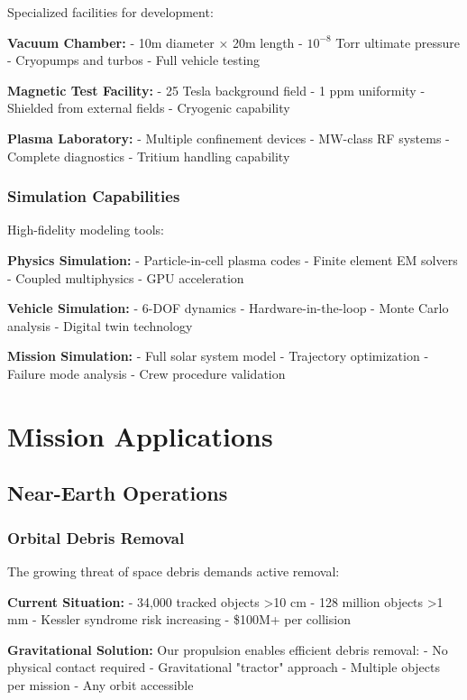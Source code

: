 \documentclass[12pt,letterpaper]{book}
\theoremstyle{definition}
\theoremstyle{plain}
\theoremstyle{remark}
\begin{document}
{{{{{Specialized facilities for development:

\textbf{Vacuum Chamber:}
- 10m diameter × 20m length
- $10^{-8}$ Torr ultimate pressure
- Cryopumps and turbos
- Full vehicle testing

\textbf{Magnetic Test Facility:}
- 25 Tesla background field
- 1 ppm uniformity
- Shielded from external fields
- Cryogenic capability

\textbf{Plasma Laboratory:}
- Multiple confinement devices
- MW-class RF systems
- Complete diagnostics
- Tritium handling capability

\subsection{Simulation Capabilities}

High-fidelity modeling tools:

\textbf{Physics Simulation:}
- Particle-in-cell plasma codes
- Finite element EM solvers
- Coupled multiphysics
- GPU acceleration

\textbf{Vehicle Simulation:}
- 6-DOF dynamics
- Hardware-in-the-loop
- Monte Carlo analysis
- Digital twin technology

\textbf{Mission Simulation:}
- Full solar system model
- Trajectory optimization
- Failure mode analysis
- Crew procedure validation

\chapter{Mission Applications}

\section{Near-Earth Operations}

\subsection{Orbital Debris Removal}

The growing threat of space debris demands active removal:

\textbf{Current Situation:}
- 34,000 tracked objects >10 cm
- 128 million objects >1 mm
- Kessler syndrome risk increasing
- \$100M+ per collision

\textbf{Gravitational Solution:}
Our propulsion enables efficient debris removal:
- No physical contact required
- Gravitational "tractor" approach
- Multiple objects per mission
- Any orbit accessible

}}}}}
\end{document}

